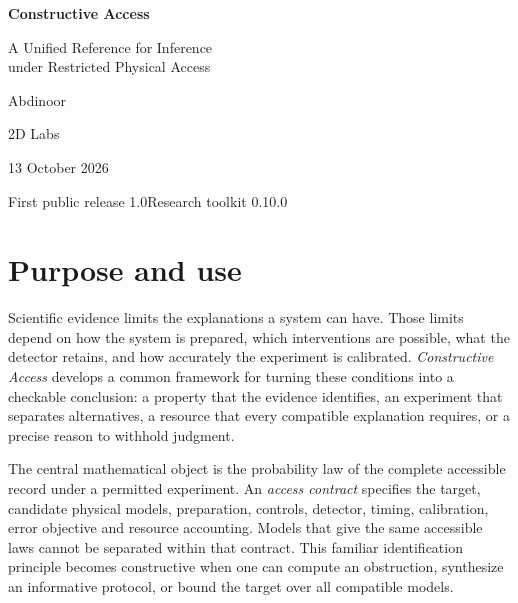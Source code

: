 \documentclass[11pt,oneside]{book}
\theoremstyle{definition}
\theoremstyle{remark}
\begin{document}
\pagestyle{plain}
\frontmatter
\begin{titlepage}
\centering
\vspace*{1.2in}
{\Huge\bfseries Constructive Access\par}
\vspace{0.4in}
{\Large A Unified Reference for Inference\\under Restricted Physical Access\par}
\vspace{0.6in}
{\Large Abdinoor\par}
\vspace{0.12in}
{\large 2D Labs\par}
\vfill
{\large 13 October 2026\par}
\vspace{0.25in}
{\normalsize First public release 1.0\quad\textbullet\quad Research toolkit 0.10.0\par}
\end{titlepage}
\chapter*{Purpose and use}

Scientific evidence limits the explanations a system can have. Those limits
depend on how the system is prepared, which interventions are possible, what
the detector retains, and how accurately the experiment is calibrated.
\emph{Constructive Access} develops a common framework for turning these
conditions into a checkable conclusion: a property that the evidence
identifies, an experiment that separates alternatives, a resource that every
compatible explanation requires, or a precise reason to withhold judgment.

The central mathematical object is the probability law of the complete
accessible record under a permitted experiment. An \emph{access contract}
specifies the target, candidate physical models, preparation, controls,
detector, timing, calibration, error objective and resource accounting.
Models that give the same accessible laws cannot be separated within that
contract. This familiar identification principle becomes constructive when
one can compute an obstruction, synthesize an informative protocol, or bound
the target over all compatible models.
\end{document}
